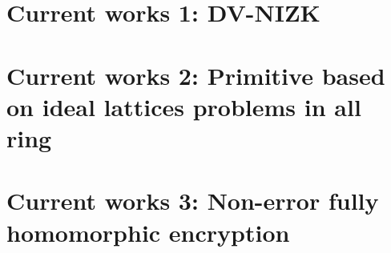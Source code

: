 \documentclass[10pt]{book}
\begin{document}
\chapter{Current works 1: DV-NIZK}


\chapter{Current works 2: Primitive based on ideal lattices problems in all ring~\cite{DBLP:conf/asiacrypt/Lyubashevsky16}}


\chapter{Current works 3: Non-error fully homomorphic encryption}



 
\end{document}
